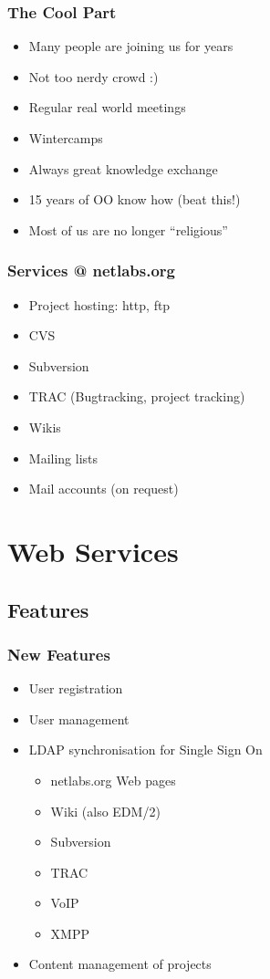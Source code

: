 \documentclass{beamer}
\begin{document}
\begin{frame}
\frametitle{The Cool Part}
\begin{itemize}
  \item Many people are joining us for years
  \item Not too nerdy crowd :)
  \item Regular real world meetings
  \item Wintercamps
  \item Always great knowledge exchange
  \item 15 years of OO know how (beat this!)
  \item Most of us are no longer ``religious''
\end{itemize}
\end{frame}

\begin{frame}
\frametitle{Services @ netlabs.org}
\begin{itemize}
  \item Project hosting: http, ftp
  \item CVS
  \item Subversion
  \item TRAC (Bugtracking, project tracking)
  \item Wikis
  \item Mailing lists
  \item Mail accounts (on request)
\end{itemize}
\end{frame}

\section{Web Services}
\subsection{Features}

\begin{frame}
\frametitle{New Features}
\begin{itemize}
  \item User registration
  \item User management
  \item LDAP synchronisation for Single Sign On
  \begin{itemize}
    \item netlabs.org Web pages
    \item Wiki (also EDM/2)
    \item Subversion
    \item TRAC
    \item VoIP
    \item XMPP
  \end{itemize}
  \item Content management of projects
\end{itemize}
\end{frame}
\end{document}

